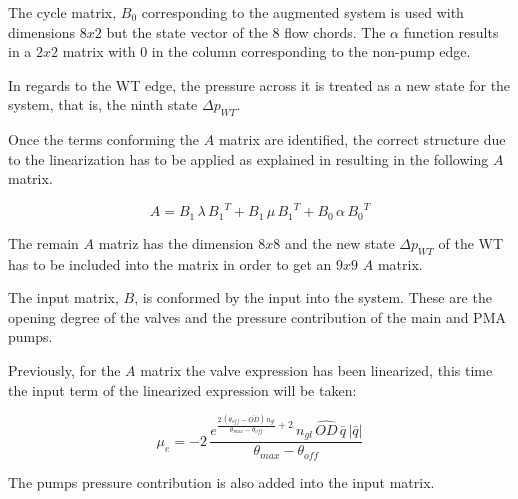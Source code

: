 The cycle matrix, $B_0$ corresponding to the augmented system is used with dimensions $8x2$ but the state vector of the 8 flow chords.
 The $\alpha$ function results in a $2x2$ matrix with $0$ in the column corresponding to the non-pump edge. 

In regards to the WT edge, the pressure across it is treated as a new state for the system, that is, the ninth state $\Delta p_{WT}$. 

Once the terms conforming the $A$ matrix are identified, the correct structure due to the linearization has to be applied as explained in \secref{} resulting in
the following $A$ matrix.

\begin{equation}
  A = B_1 \, \lambda \, {B_1}^T + B_1 \, \mu \, {B_1}^T + B_0 \, \alpha \, {B_0}^T
\end{equation}

The remain $A$ matriz has the dimension $8x8$ and the new state $\Delta p_{WT}$ of the WT has to be included into the matrix in order to get an $9x9$ $A$ 
matrix. 

The input matrix, $B$, is conformed by the input into the system. These are the opening degree of the valves and the pressure contribution of the main 
and PMA pumps. 

Previously, for the $A$ matrix the valve expression has been linearized, this time the input term of the linearized expression will be taken:

\begin{equation}
  {\mu}_e = -2 \, \frac{e^{\frac{2 \, (\theta_{off} - \bar{OD}) \, n_{gl}}{\theta_{max}-\theta_{off}}+2}
   \, n_{gl} \, \hat{OD} \, \bar{q} \, |\bar{q}|}{\theta_{max}-\theta_{off}}
\end{equation}

The pumps pressure contribution is also added into the input matrix. 


